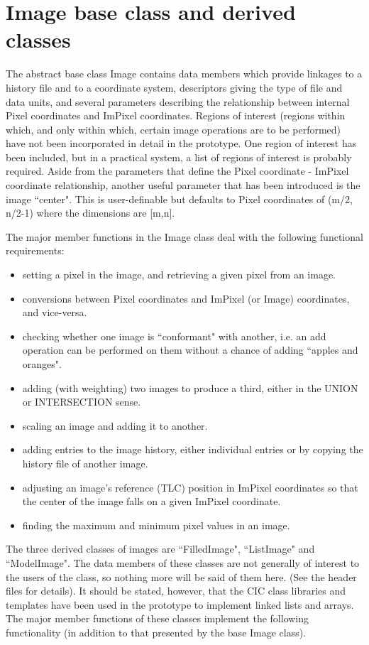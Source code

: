 \section{Image base class and derived classes}

        The abstract base class Image contains data members which provide
linkages to a history file and to a coordinate system, descriptors giving
the type of file and data units, and several parameters describing the
relationship between internal Pixel coordinates and ImPixel coordinates.
Regions of interest (regions within which, and only within which, certain
image operations are to be performed) have not been incorporated in detail in
the prototype. One region of interest has been included, but in a practical
system, a list of regions of interest is probably required. Aside from the
parameters that define the Pixel coordinate - ImPixel coordinate relationship,
another useful parameter that has been introduced is the image ``center". This
is user-definable but defaults to Pixel coordinates of (m/2, n/2-1) where the 
dimensions are [m,n]. 


        The major member functions in the Image class deal with the following
functional requirements:

\begin{itemize}
\item
setting a pixel in the image, and retrieving a given pixel from an image.
\item
conversions between Pixel coordinates and ImPixel (or Image) coordinates,
and vice-versa.
\item
checking whether one image is ``conformant" with another, i.e. an add operation
can be performed on them without a chance of adding ``apples and oranges".
\item
adding (with weighting) two images to produce a third, either in the UNION
or INTERSECTION sense.
\item
scaling an image and adding it to another.
\item
adding entries to the image history, either individual entries or by copying the
history file of another image.
\item
adjusting an image's reference (TLC) position in ImPixel coordinates so
that the center of the image falls on a given ImPixel coordinate.
\item
finding the maximum and minimum pixel values in an image.
\end{itemize}

     The three derived classes of images are ``FilledImage", ``ListImage"
and ``ModelImage". The data members of these classes are not generally of
interest to the users of the class, so nothing more will be said of them
here. (See the header files for details). It should be stated, however, that
the CIC class libraries and templates have been used in the prototype to
implement linked lists and arrays. The major member functions of these classes
implement the following functionality (in addition to that presented by the base Image class).

